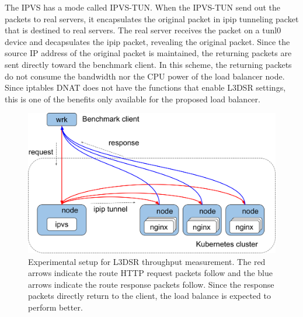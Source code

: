 The IPVS has a mode called IPVS-TUN.
When the IPVS-TUN send out the packets to real servers, it encapsulates the original packet in ipip tunneling packet \cite{kuznetsov1999tunnels} that is destined to real servers.
The real server receives the packet on a tunl0 device and decapsulates the ipip packet, revealing the original packet.
Since the source IP address of the original packet is maintained, the returning packets are sent directly toward the benchmark client.
In this scheme, the returning packets do not consume the bandwidth nor the CPU power of the load balancer node.
Since iptables DNAT does not have the functions that enable L3DSR settings, this is one of the benefits only available  for the proposed load balancer.

\begin{figure}[h]
  \centering
  \includegraphics[width=0.8\columnwidth]{Figs/benchmark-schem-dsr}
  \par\bigskip
  \centering
  \begin{minipage}{0.9\columnwidth}
    \caption[Experimental setup for L3DSR throughput measurement]{
      Experimental setup for L3DSR throughput measurement.
      The red arrows indicate the route HTTP request packets follow and the blue arrows indicate the route response packets follow.
      Since the response packets directly return to the client, the load balance is expected to perform better.
    }
    \label{fig:benchmark-schem-dsr}
  \end{minipage}
\end{figure}

